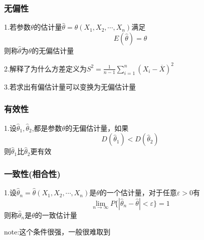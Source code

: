 \documentclass[11pt,twoside,a4paper]{ctexart}
\begin{document}
\subsubsection{无偏性}
1.若参数$\theta $的估计量$\widehat{\theta } = \widehat{\theta}(X_1,X_2,\cdots ,X_n)$满足
\[E(\widehat{\theta }) = \theta \]
则称$\widehat{\theta }$为$\theta $的无偏估计量

2.解释了为什么方差定义为$S^2 = \frac{1}{n-1}\sum _{i=1}^n(X_i - \overline{X})^2$

3.若求出有偏估计量可以变换为无偏估计量

\subsubsection{有效性}
1.设$\widehat{\theta }_1,\widehat{\theta }_2$,都是参数$\theta $的无偏估计量，如果
\[D(\widehat{\theta }_1) < D(\widehat{\theta }_2)\]
则$\widehat{\theta }_1$比$\widehat{\theta }_2$更有效

\subsubsection{一致性(相合性)}

1.设$\widehat{\theta }_n= \widehat{\theta}(X_1,X_2,\cdots ,X_n)$是$\theta$的一个估计量，对于任意$\varepsilon > 0 $有
\[\lim_{n \to \infty} P\{|\widehat{\theta }_n - \widehat{\theta }| < \varepsilon \} = 1  \] 
则称$\widehat{\theta }_n$是$\theta$的一致估计量

note:这个条件很强，一般很难取到
\end{document}

